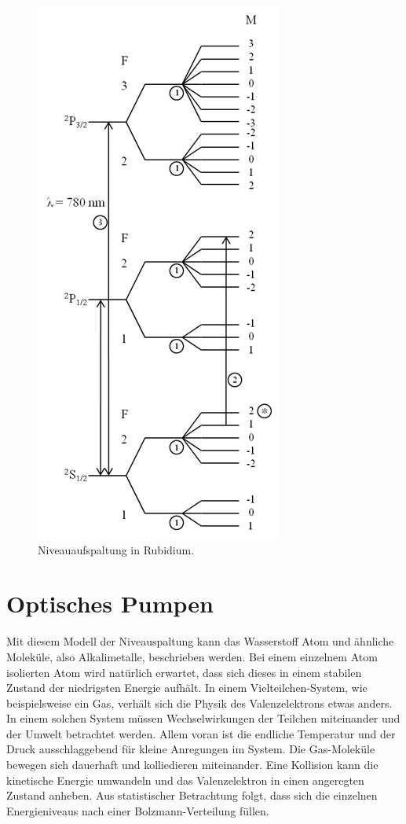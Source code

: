 \begin{figure}
              \centering
              \includegraphics[height = \textheight]{content/v21_bilder/zeeman_splitting.jpg}
              \caption{Niveauaufspaltung in Rubidium.}
              \label{fig:energieschema}
\end{figure}

\section{Optisches Pumpen}
\label{sec:pumpen}
Mit diesem Modell der Niveauspaltung kann das Wasserstoff Atom und ähnliche Moleküle, also Alkalimetalle, beschrieben werden. Bei einem einzelnem Atom isolierten Atom wird natürlich 
erwartet, dass sich dieses in einem stabilen Zustand der niedrigsten Energie aufhält. In einem Vielteilchen-System, wie beispielsweise ein Gas, verhält sich die Physik des 
Valenzelektrons etwas anders. In einem solchen System müssen Wechselwirkungen der Teilchen miteinander und der Umwelt betrachtet werden. Allem voran ist die endliche Temperatur 
und der Druck ausschlaggebend für kleine Anregungen im System. Die Gas-Moleküle bewegen sich dauerhaft und kolliedieren miteinander. Eine Kollision kann die kinetische Energie umwandeln 
und das Valenzelektron in einen angeregten Zustand anheben. Aus statistischer Betrachtung folgt, dass sich die einzelnen Energieniveaus nach einer Bolzmann-Verteilung füllen. 

